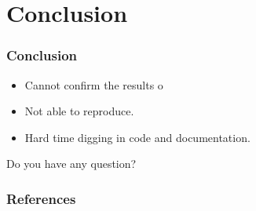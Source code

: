 \documentclass[10pt, aspectratio = 169]{beamer}
\begin{document}
\section{Conclusion}
\begin{frame}
    \frametitle{Conclusion}
    \begin{itemize}
        \item Cannot confirm the results o
        \item Not able to reproduce.
        \item Hard time digging in code and documentation.
    \end{itemize}

    \begin{block}{Do you have any question?}
        
    \end{block}
\end{frame}

\begin{frame}
    \frametitle{References}
    \scriptsize
    
    

\end{frame}

\end{document}
